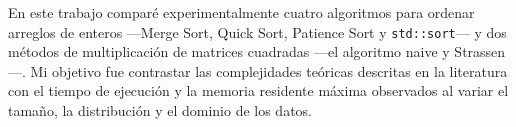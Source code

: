 En este trabajo comparé experimentalmente cuatro algoritmos para ordenar
arreglos de enteros ---Merge Sort, Quick Sort, Patience Sort y
\texttt{std::sort}--- y dos métodos de multiplicación de matrices cuadradas
---el algoritmo naive y Strassen---. Mi objetivo fue contrastar las
complejidades teóricas descritas en la literatura \cite{clrs2022,mallows1962,strassen1969}
con el tiempo de ejecución y la memoria residente máxima observados al variar
el tamaño, la distribución y el dominio de los datos.
